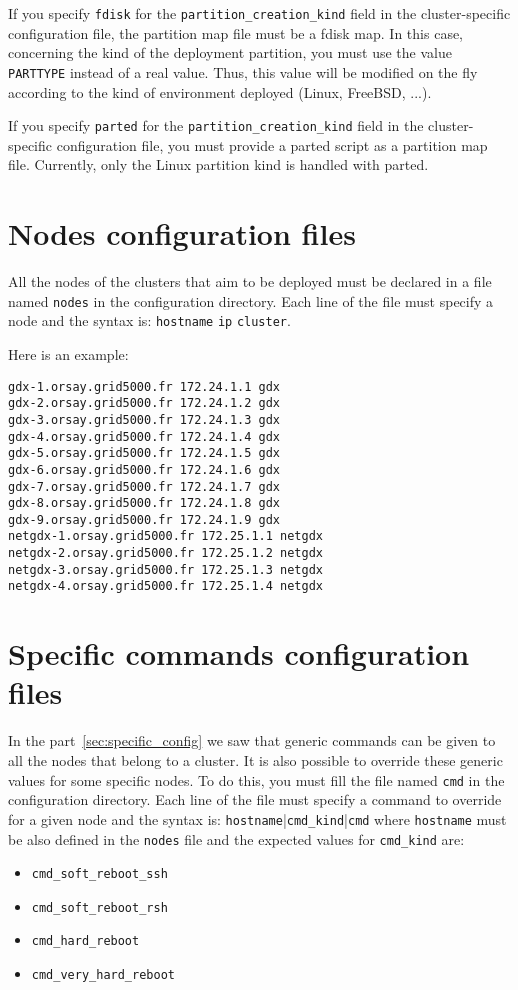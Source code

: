 \documentclass[a4wide,10pt,oneside]{book}
\begin{document}
If you specify \texttt{fdisk} for the \texttt{partition\_creation\_kind} field in the cluster-specific configuration file, the partition map file must be a fdisk map. In this case, concerning the kind of the deployment partition, you must use the value \texttt{PARTTYPE} instead of a real value. Thus, this value will be modified on the fly according to the kind of environment deployed (Linux, FreeBSD, ...).

If you specify \texttt{parted} for the \texttt{partition\_creation\_kind} field in the cluster-specific configuration file, you must provide a parted script as a partition map file. Currently, only the Linux partition kind is handled with parted.

\section{Nodes configuration files}
All the nodes of the clusters that aim to be deployed must be declared in a file named \texttt{nodes} in the configuration directory. Each line of the file must specify a node and the syntax is: \texttt{hostname} \texttt{ip} \texttt{cluster}.

Here is an example:
\begin{small}
\begin{verbatim}
gdx-1.orsay.grid5000.fr 172.24.1.1 gdx
gdx-2.orsay.grid5000.fr 172.24.1.2 gdx
gdx-3.orsay.grid5000.fr 172.24.1.3 gdx
gdx-4.orsay.grid5000.fr 172.24.1.4 gdx
gdx-5.orsay.grid5000.fr 172.24.1.5 gdx
gdx-6.orsay.grid5000.fr 172.24.1.6 gdx
gdx-7.orsay.grid5000.fr 172.24.1.7 gdx
gdx-8.orsay.grid5000.fr 172.24.1.8 gdx
gdx-9.orsay.grid5000.fr 172.24.1.9 gdx
netgdx-1.orsay.grid5000.fr 172.25.1.1 netgdx
netgdx-2.orsay.grid5000.fr 172.25.1.2 netgdx
netgdx-3.orsay.grid5000.fr 172.25.1.3 netgdx
netgdx-4.orsay.grid5000.fr 172.25.1.4 netgdx
\end{verbatim}
\end{small}

\section{Specific commands configuration files}
In the part~\ref{sec:specific_config} we saw that generic commands can be given to all the nodes that belong to a cluster. It is also possible to override these generic values for some specific nodes. To do this, you must fill the file named \texttt{cmd} in the configuration directory. Each line of the file must specify a command to override for a given node and the syntax is: \texttt{hostname}|\texttt{cmd\_kind}|\texttt{cmd} where \texttt{hostname} must be also defined in the \texttt{nodes} file and the expected values for \texttt{cmd\_kind} are:
\begin{itemize}
\item \texttt{cmd\_soft\_reboot\_ssh}
\item \texttt{cmd\_soft\_reboot\_rsh}
\item \texttt{cmd\_hard\_reboot}
\item \texttt{cmd\_very\_hard\_reboot}
\end{itemize}
\end{document}
